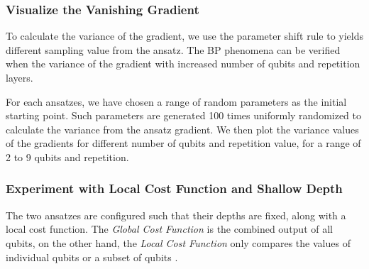 \subsubsection{Visualize the Vanishing Gradient}
To calculate the variance of the gradient, we use the parameter shift rule to yields different sampling value from the ansatz.
The BP phenomena can be verified when the variance of the gradient with increased number of qubits and repetition layers.

For each ansatzes, we have chosen a range of random parameters as the initial starting point.
Such parameters are generated 100 times uniformly randomized to calculate the variance from the ansatz gradient.
We then plot the variance values of the gradients for different number of qubits and repetition value, for a range of 2 to 9 qubits and repetition.

\subsubsection{Experiment with Local Cost Function and Shallow Depth}
The two ansatzes are configured such that their depths are fixed, along with a local cost function.
The \textit{Global Cost Function} is the combined output of all qubits, on the other hand, the \textit{Local Cost Function} only compares the values of individual qubits or a subset of qubits \cite{cerezoCostFunctionDependent2021}.